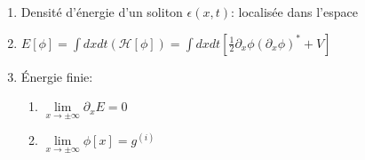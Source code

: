 \documentclass[handout]{beamer}
\begin{document}
\begin{frame}
 \begin{columns}
    \begin{column}{.5\linewidth}
       \begin{figure}[0.3\textwidth]
    \end{figure}
    \end{column}
    \begin{column}{.5\linewidth}
	\begin{enumerate}
	\item Densité d'énergie d'un soliton $\epsilon(x,t)$: localisée dans l'espace
	\item $E[\phi] = \int{dxdt (\mathcal{H}[\phi])} = \int{dxdt [\frac{1}{2} \partial_x \phi (\partial_x \phi)^* +V]}$
	\item Énergie finie:
	\begin{enumerate}
	\item  $\lim\limits_{x \to \pm\infty}\partial_x E =0$
	\item  $\lim\limits_{x \to \pm\infty} \phi[x] = g^{(i)}$
	
	\end{enumerate}	
	\end{enumerate} 
    \end{column}
  \end{columns}
\end{frame}
\end{document}
